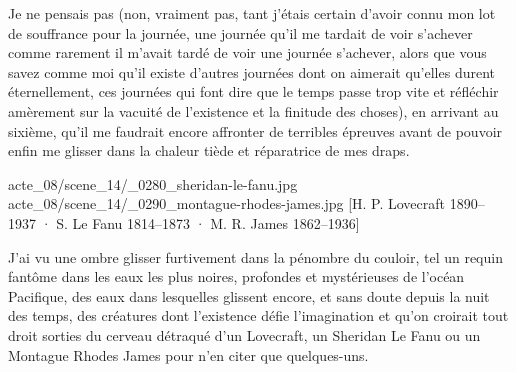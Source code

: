 Je ne pensais pas (non, vraiment pas, tant j’étais certain d’avoir connu mon lot de souffrance pour la journée, une journée qu’il me tardait de voir s’achever comme rarement il m’avait tardé de voir une journée s’achever, alors que vous savez comme moi qu’il existe d’autres journées dont on aimerait qu’elles durent éternellement, ces journées qui font dire que le temps passe trop vite et réfléchir amèrement sur la vacuité de l’existence et la finitude des choses), en arrivant au sixième, qu’il me faudrait encore affronter de terribles épreuves avant de pouvoir enfin me glisser dans la chaleur tiède et réparatrice de mes draps.

%
%
%
{acte_08/scene_14/_0280_sheridan-le-fanu.jpg}
{acte_08/scene_14/_0290_montague-rhodes-james.jpg}
[{H. P. Lovecraft \textup{1890--1937} · S. Le Fanu \textup{1814--1873} · M. R. James \textup{1862--1936}}]

J’ai vu une ombre glisser furtivement dans la pénombre du couloir, tel un requin fantôme dans les eaux les plus noires, profondes et mystérieuses de l’océan Pacifique, des eaux dans lesquelles glissent encore, et sans doute depuis la nuit des temps, des créatures dont l’existence défie l’imagination et qu’on croirait tout droit sorties du cerveau détraqué d’un Lovecraft, un Sheridan Le Fanu ou un Montague Rhodes James pour n’en citer que quelques-uns.

